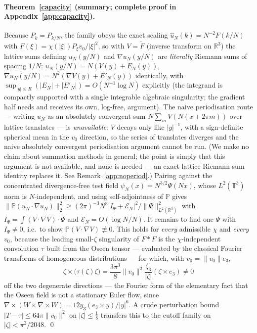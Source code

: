 \documentclass[11pt]{article}
\theoremstyle{definition}
\newcommand{\T}{\mathbb T}
\newcommand{\R}{\mathbb R}
\newcommand{\PP}{\mathbb P}
\begin{document}
\paragraph{Theorem~\ref{capacity} (summary; complete proof in
Appendix~\ref{app:capacity}).}
Because $P_k=P_{k/N}$, the family obeys the exact scaling
$\hat u_N(k)=N^{-2}F(k/N)$ with $F(\xi)=\chi(|\xi|)P_\xi v_0/|\xi|^2$,
so with $V=\widetilde F$ (inverse transform on $\R^3$) the lattice sums
defining $u_N(y/N)$ and $\nabla u_N(y/N)$ are \emph{literally} Riemann
sums of spacing $1/N$:
$u_N(y/N)=N(V(y)+E_N(y))$, $\nabla u_N(y/N)=N^2(\nabla V(y)+E'_N(y))$
identically, with $\sup_{|y|\le R}(|E_N|+|E'_N|)=O(N^{-1}\log N)$
explicitly (the integrand is compactly supported with a single
integrable algebraic singularity; the gradient half needs and receives
its own, log-free, argument). The naive periodisation route --- writing
$u_N$ as an absolutely convergent sum $N\sum_mV(N(x+2\pi m))$ over
lattice translates --- is \emph{unavailable}: $V$ decays only like
$|y|^{-1}$, with a sign-definite spherical mean in the $v_0$
direction, so the series of translates diverges and the naive
absolutely convergent periodisation argument cannot be run. (We make no
claim about summation methods in general; the point is simply that this
argument is not available, and none is needed --- an exact
lattice-Riemann-sum identity replaces it. See
Remark~\ref{app:noperiod}.) Pairing against the
concentrated divergence-free test field $\psi_N(x)=N^{3/2}\Psi(Nx)$,
whose $L^2(\T^3)$ norm is $N$-independent, and using self-adjointness of
$\PP$ gives
$\|\PP(u_N\cdot\nabla u_N)\|_2^2\ge(2\pi)^{-3}N^3|I_\Psi+\mathcal
E_N|^2/\|\Psi\|_{L^2(\R^3)}^2$ with
$I_\Psi=\int(V\cdot\nabla V)\cdot\Psi$ and $\mathcal E_N=O(\log N/N)$.
It remains to find one $\Psi$ with $I_\Psi\neq0$, i.e.\ to show
$\PP(V\cdot\nabla V)\not\equiv0$. This holds for \emph{every} admissible
$\chi$ and \emph{every} $v_0$, because the leading small-$\zeta$
singularity of $F*F$ is the $\chi$-independent convolution $\tau$ built
from the Oseen tensor \cite{LadyzhenskayaBook,Galdi2011} --- evaluated
by the classical Fourier transforms of homogeneous distributions
\cite{SteinWeiss,GelfandShilov,Grafakos} --- for which, with
$v_0=\|v_0\|e_3$,
\[
\zeta\times\big(\tau(\zeta)\zeta\big)
=\frac{3\pi^3}{8}\|v_0\|^2\frac{\zeta_3}{|\zeta|}(\zeta\times e_3)\neq0
\]
off the two degenerate directions --- the Fourier form of the elementary
fact that the Oseen field is not a stationary Euler flow, since
$\nabla\times(W\times\nabla\times W)=12y_3(e_3\times y)/|y|^6$. A crude
perturbation bound $|T-\tau|\le64\pi\|v_0\|^2$ on $|\zeta|\le\tfrac18$
transfers this to the cutoff family on $|\zeta|<\pi^2/2048$.
\qed
\end{document}

